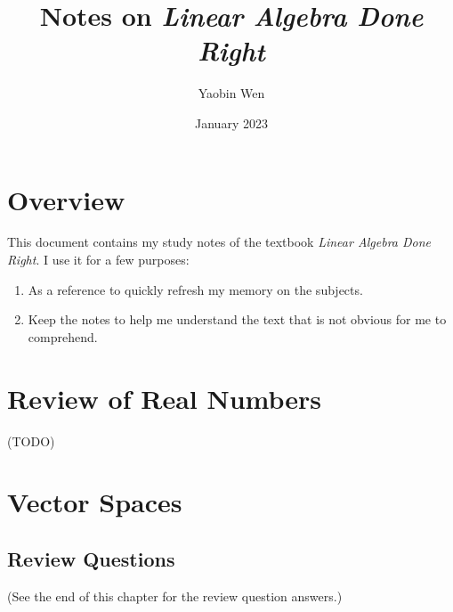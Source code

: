 \documentclass[12pt, letterpaper, oneside]{book}
\title{Notes on \textit{Linear Algebra Done Right}}
\author{Yaobin Wen}
\date{January 2023}
\begin{document}
\maketitle
\tableofcontents

\chapter*{Overview}

This document contains my study notes of the textbook \textit{Linear Algebra
Done Right}. I use it for a few purposes:

\begin{enumerate}
  \item As a reference to quickly refresh my memory on the subjects.
  \item Keep the notes to help me understand the text that is not obvious for
    me to comprehend.
\end{enumerate}

%
%

\chapter*{Review of Real Numbers}

(TODO)

%
%

\chapter{Vector Spaces}

\section{Review Questions}

(See the end of this chapter for the review question answers.)
\end{document}
